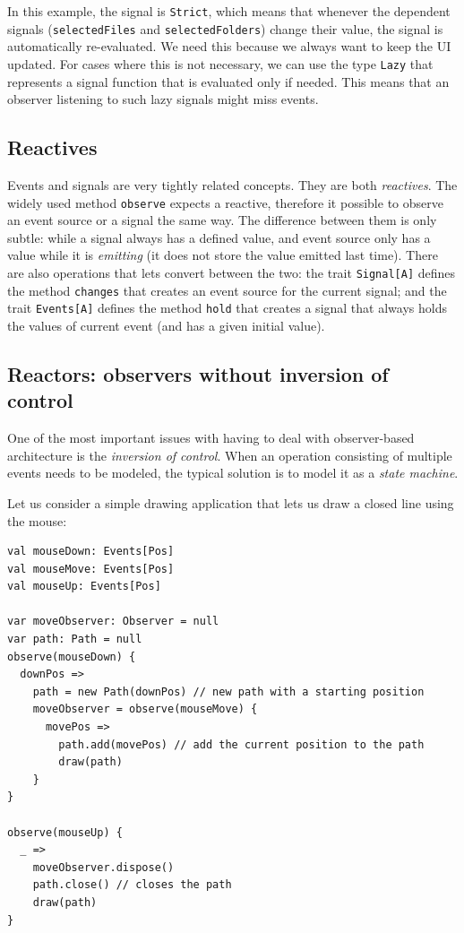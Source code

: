 In this example, the signal is \texttt{Strict}, which means that whenever the dependent signals (\texttt{selectedFiles} and \texttt{selectedFolders}) change their value, the signal is automatically re-evaluated. We need this because we always want to keep the UI updated. For cases where this is not necessary, we can use the type \texttt{Lazy} that represents a signal function that is evaluated only if needed. This means that an observer listening to such lazy signals might miss events.

\subsection{Reactives}

Events and signals are very tightly related concepts. They are both \emph{reactives}. The widely used method \texttt{observe} expects a reactive, therefore it possible to observe an event source or a signal the same way. The difference between them is only subtle: while a signal always has a defined value, and event source only has a value while it is \emph{emitting} (it does not store the value emitted last time). There are also operations that lets convert between the two: the trait \texttt{Signal[A]} defines the method \texttt{changes} that creates an event source for the current signal; and the trait \texttt{Events[A]} defines the method \texttt{hold} that creates a signal that always holds the values of current event (and has a given initial value).

\subsection{Reactors: observers without inversion of control}

One of the most important issues with having to deal with observer-based architecture is the \emph{inversion of control}. When an operation consisting of multiple events needs to be modeled, the typical solution is to model it as a \emph{state machine}. 

Let us consider a simple drawing application that lets us draw a closed line using the mouse:
\begin{lstlisting}
val mouseDown: Events[Pos]
val mouseMove: Events[Pos]
val mouseUp: Events[Pos]

var moveObserver: Observer = null
var path: Path = null
observe(mouseDown) {
  downPos => 
    path = new Path(downPos) // new path with a starting position
    moveObserver = observe(mouseMove) {
      movePos =>
        path.add(movePos) // add the current position to the path
        draw(path)
    }
}

observe(mouseUp) {
  _ =>
    moveObserver.dispose()
    path.close() // closes the path
    draw(path)
}
\end{lstlisting}

